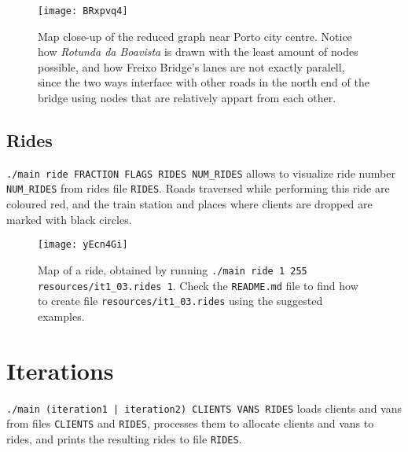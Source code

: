 \begin{figure}[H]
    \centering
    \texttt{[image: BRxpvq4]}
    \caption[Map close-up of the reduced graph near Porto city centre]{Map close-up of the reduced graph near Porto city centre. Notice how \emph{Rotunda da Boavista} is drawn with the least amount of nodes possible, and how Freixo Bridge's lanes are not exactly paralell, since the two ways interface with other roads in the north end of the bridge using nodes that are relatively appart from each other.}
\end{figure}

\subsection{Rides}
\texttt{./main ride FRACTION FLAGS RIDES NUM\_RIDES} allows to visualize ride number \texttt{NUM\_RIDES} from rides file \texttt{RIDES}. Roads traversed while performing this ride are coloured red, and the train station and places where clients are dropped are marked with black circles.

\begin{figure}[H]
    \centering
    \texttt{[image: yEcn4Gi]}
    \caption[Map of a ride]{Map of a ride, obtained by running \texttt{./main ride 1 255 resources/it1\_03.rides 1}. Check the \texttt{README.md} file to find how to create file \texttt{resources/it1\_03.rides} using the suggested examples.}
\end{figure}

\section{Iterations}
\texttt{./main (iteration1 | iteration2) CLIENTS VANS RIDES} loads clients and vans from files \texttt{CLIENTS} and \texttt{RIDES}, processes them to allocate clients and vans to rides, and prints the resulting rides to file \texttt{RIDES}. 
